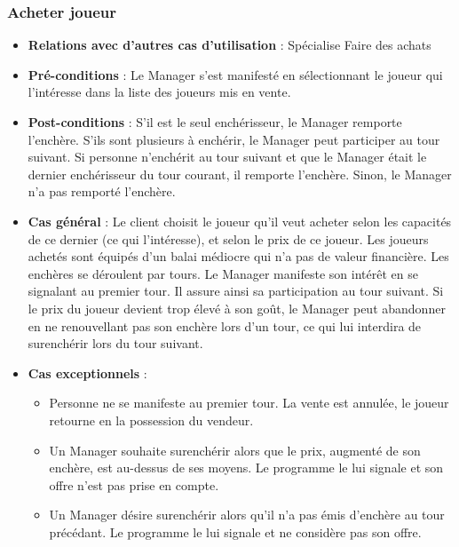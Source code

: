 \documentclass[a4paper,titlepage]{scrreprt}
\begin{document}
    \subsubsection{Acheter joueur}
      \begin{itemize}
        \item \textbf{Relations avec d'autres cas d'utilisation}  : Spécialise Faire des achats
        \item \textbf{Pré-conditions} : Le Manager s'est manifesté en sélectionnant le joueur qui l'intéresse dans la liste des joueurs mis en vente.
        \item \textbf{Post-conditions} : S'il est le seul enchérisseur, le Manager remporte l'enchère. S'ils sont plusieurs à enchérir, le Manager peut participer au tour suivant. Si personne n'enchérit au tour suivant et que le Manager était le dernier enchérisseur du tour courant, il remporte l'enchère. Sinon, le Manager n'a pas remporté l'enchère.
        \item \textbf{Cas général} : Le client choisit le joueur qu’il veut acheter selon les capacités de ce dernier (ce qui l’intéresse), et selon le prix de ce joueur. Les joueurs achetés sont équipés d'un balai médiocre qui n'a pas de valeur financière. Les enchères se déroulent par tours. Le Manager manifeste son intérêt en se signalant au premier tour. Il assure ainsi sa participation au tour suivant. Si le prix du joueur devient trop élevé à son goût, le Manager peut abandonner en ne renouvellant pas son enchère lors d'un tour, ce qui lui interdira de surenchérir lors du tour suivant.
        \item \textbf{Cas exceptionnels} :
        \begin{itemize}
            \item Personne ne se manifeste au premier tour. La vente est annulée, le joueur retourne en la possession du vendeur.
            \item Un Manager souhaite surenchérir alors que le prix, augmenté de son enchère, est au-dessus de ses moyens. Le programme le lui signale et son offre n'est pas prise en compte.
            \item Un Manager désire surenchérir alors qu'il n'a pas émis d'enchère au tour précédant. Le programme le lui signale et ne considère pas son offre.
          \end{itemize}
      \end{itemize}
\end{document}
